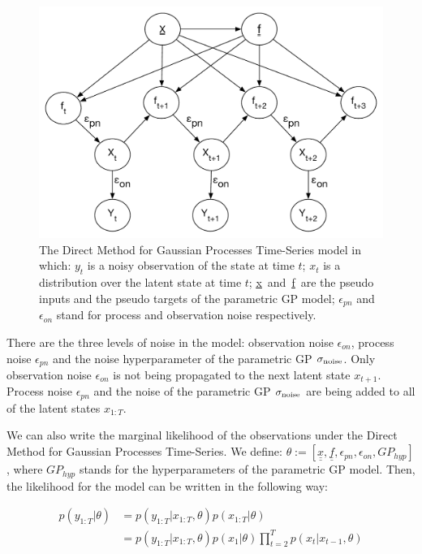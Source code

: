 \begin{figure}[H]
\centering
\includegraphics[width=1\textwidth, scale=1]{plots/ssm_model}
\caption{\label{fig:dtsm:basic}The Direct Method for Gaussian Processes Time-Series model in which: $y_{t}$ is a noisy observation of the state at time $t$; $x_{t}$ is a distribution over the latent state at time $t$; \underline{\underline{x}}\ and\ \underline{\underline{f}}\ are the pseudo inputs and the pseudo targets of the parametric GP model; $\epsilon_{pn}$ and $\epsilon_{on}$ stand for process and observation noise respectively.}
\end{figure}

\noindent There are the three levels of noise in the model: observation noise $\epsilon_{on}$, process noise $\epsilon_{pn}$ and the noise hyperparameter of the parametric GP $\sigma_{\rm noise}$. Only observation noise $\epsilon_{on}$ is not being propagated to the next latent state $x_{t+1}$. Process noise $\epsilon_{pn}$ and the noise of the parametric GP $\sigma_{\rm noise}$ are being added to all of the latent states $x_{1:T}$.

\noindent We can also write the marginal likelihood of the observations under the Direct Method for Gaussian Processes Time-Series. We define: $\theta := [\underline{\underline{x}}, \underline{\underline{f}}, \epsilon_{pn}, \epsilon_{on}, GP_{hyp}]$, where $GP_{hyp}$ stands for the hyperparameters of the parametric GP model. Then, the likelihood for the model can be written in the following way:
	
\begin{equation} \label{eq:ssm:lik}
\begin{split}
p(y_{1:T}|\theta) & = p(y_{1:T}|x_{1:T},\theta) p(x_{1:T}|\theta) \\
& =	p(y_{1:T}|x_{1:T},\theta) p(x_{1}| \theta) \prod_{t=2}^{T} p(x_{t}|x_{t-1}, \theta)
\end{split}
\end{equation}

